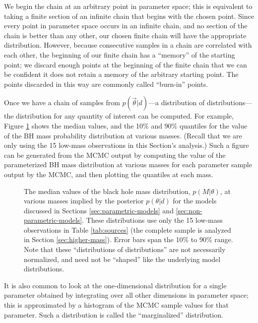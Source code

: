 \documentclass[preprint]{aastex}
\newcommand{\vtheta}{\vec{\theta}}
\begin{document}
We begin the chain at an arbitrary point in parameter space; this is
equivalent to taking a finite section of an infinite chain that begins
with the chosen point.  Since every point in parameter space occurs in
an infinite chain, and no section of the chain is better than any
other, our chosen finite chain will have the appropriate distribution.
However, because consecutive samples in a chain are correlated with
each other, the beginning of our finite chain has a ``memory'' of the
starting point; we discard enough points at the beginning of the
finite chain that we can be confident it does not retain a memory of
the arbitrary starting point.  The points discarded in this way are
commonly called ``burn-in'' points.

Once we have a chain of samples from $p(\vtheta|d)$---a distribution
of distributions---the distribution for any quantity of interest can
be computed.  For example, Figure \ref{fig:dists} shows the median
values, and the 10\% and 90\% quantiles for the value of the BH mass
probability distribution at various masses.  (Recall that we are only
using the 15 low-mass observations in this Section's analysis.)  Such
a figure can be generated from the MCMC output by computing the value
of the parameterized BH mass distribution at various masses for each
parameter sample output by the MCMC, and then plotting the quantiles
at each mass.

\begin{figure}
  \begin{center}
  \end{center}
  \caption{\label{fig:dists} The median values of the black hole mass
    distribution, $p(M|\theta)$, at various masses implied by the
    posterior $p(\theta|d)$ for the models discussed in Sections
    \ref{sec:parametric-models} and
    \ref{sec:non-parametric-models}.  These distributions use only
    the 15 low-mass observations in Table \ref{tab:sources} (the
    complete sample is analyzed in Section \ref{sec:higher-mass}).
    Error bars span the 10\% to 90\% range.  Note that these
    ``distributions of distributions'' are not necessarily normalized,
    and need not be ``shaped'' like the underlying model
    distributions.}
\end{figure}

It is also common to look at the one-dimensional distribution for a
single parameter obtained by integrating over all other dimensions in
parameter space; this is approximated by a histogram of the MCMC
sample values for that parameter.  Such a distribution is called the
``marginalized'' distribution.
\end{document}
